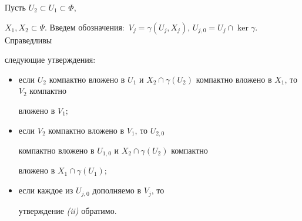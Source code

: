 \begin{thms} \label{tcomp}


Пусть $U_2 \subset U_1 \subset \Phi$,


$X_1, X_2 \subset \Psi$. Введем обозначения\/${:}$ $V_j =


\gamma(U_j,X_j)$, $U_{j,0}=U_j \cap \ker \gamma$. Справедливы


следующие утверждения\/${:}$


\begin{itemize}


\item[(i)] если $U_2$ компактно вложено в $U_1$ и $X_2 \cap


\gamma(U_2)$ компактно вложено в $X_1$, то $V_2$ компактно


вложено в $V_1;$


\item[(ii)] если $V_2$ компактно вложено в $V_1$, то $U_{2,0}$


компактно вложено в $U_{1,0}$ и $X_2 \cap \gamma(U_2)$ компактно


вложено в $X_1 \cap \gamma(U_1);$


\item[(iii)] если каждое из $U_{j,0}$ дополняемо в $V_j$, то


утверждение {\em (ii)} обратимо.


\end{itemize}


\end{thms}





